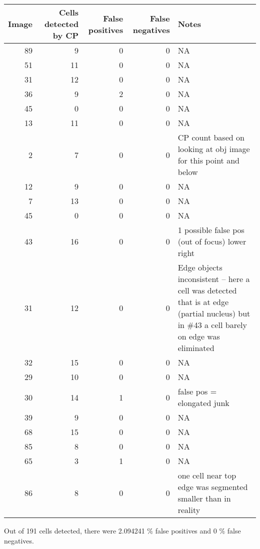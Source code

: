 \documentclass[]{article}
\newenvironment{Shaded}{\begin{snugshade}}{\end{snugshade}}
\newcommand{\KeywordTok}[1]{\textcolor[rgb]{0.13,0.29,0.53}{\textbf{#1}}}
\newcommand{\DataTypeTok}[1]{\textcolor[rgb]{0.13,0.29,0.53}{#1}}
\newcommand{\DecValTok}[1]{\textcolor[rgb]{0.00,0.00,0.81}{#1}}
\newcommand{\StringTok}[1]{\textcolor[rgb]{0.31,0.60,0.02}{#1}}
\newcommand{\OperatorTok}[1]{\textcolor[rgb]{0.81,0.36,0.00}{\textbf{#1}}}
\newcommand{\NormalTok}[1]{#1}
\begin{document}
\begin{longtable}[]{@{}rrrrl@{}}
\toprule
Image & Cells detected by CP & False positives & False negatives &
Notes\tabularnewline
\midrule
\endhead
89 & 9 & 0 & 0 & NA\tabularnewline
51 & 11 & 0 & 0 & NA\tabularnewline
31 & 12 & 0 & 0 & NA\tabularnewline
36 & 9 & 2 & 0 & NA\tabularnewline
45 & 0 & 0 & 0 & NA\tabularnewline
13 & 11 & 0 & 0 & NA\tabularnewline
2 & 7 & 0 & 0 & CP count based on looking at obj image for this point
and below\tabularnewline
12 & 9 & 0 & 0 & NA\tabularnewline
7 & 13 & 0 & 0 & NA\tabularnewline
45 & 0 & 0 & 0 & NA\tabularnewline
43 & 16 & 0 & 0 & 1 possible false pos (out of focus) lower
right\tabularnewline
31 & 12 & 0 & 0 & Edge objects inconsistent -- here a cell was detected
that is at edge (partial nucleus) but in \#43 a cell barely on edge was
eliminated\tabularnewline
32 & 15 & 0 & 0 & NA\tabularnewline
29 & 10 & 0 & 0 & NA\tabularnewline
30 & 14 & 1 & 0 & false pos = elongated junk\tabularnewline
39 & 9 & 0 & 0 & NA\tabularnewline
68 & 15 & 0 & 0 & NA\tabularnewline
85 & 8 & 0 & 0 & NA\tabularnewline
65 & 3 & 1 & 0 & NA\tabularnewline
86 & 8 & 0 & 0 & one cell near top edge was segmented smaller than in
reality\tabularnewline
\bottomrule
\end{longtable}

\begin{Shaded}
\end{Shaded}

Out of 191 cells detected, there were 2.094241 \% false positives and 0
\% false negatives.
\end{document}
